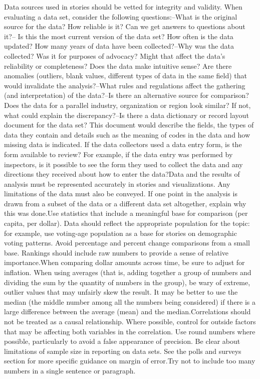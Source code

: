 \documentclass[]{book}
\begin{document}
Data sources used in stories should be vetted for integrity and validity. When evaluating a data set, consider the following questions:--What is the original source for the data? How reliable is it? Can we get answers to questions about it?-- Is this the most current version of the data set? How often is the data updated? How many years of data have been collected?--Why was the data collected? Was it for purposes of advocacy? Might that affect the data's reliability or completeness? Does the data make intuitive sense? Are there anomalies (outliers, blank values, different types of data in the same field) that would invalidate the analysis?--What rules and regulations affect the gathering (and interpretation) of the data?--Is there an alternative source for comparison? Does the data for a parallel industry, organization or region look similar? If not, what could explain the discrepancy?--Is there a data dictionary or record layout document for the data set? This document would describe the fields, the types of data they contain and details such as the meaning of codes in the data and how missing data is indicated. If the data collectors used a data entry form, is the form available to review? For example, if the data entry was performed by inspectors, is it possible to see the form they used to collect the data and any directions they received about how to enter the data?Data and the results of analysis must be represented accurately in stories and visualizations. Any limitations of the data must also be conveyed. If one point in the analysis is drawn from a subset of the data or a different data set altogether, explain why this was done.Use statistics that include a meaningful base for comparison (per capita, per dollar). Data should reflect the appropriate population for the topic: for example, use voting-age population as a base for stories on demographic voting patterns. Avoid percentage and percent change comparisons from a small base. Rankings should include raw numbers to provide a sense of relative importance.When comparing dollar amounts across time, be sure to adjust for inflation. When using averages (that is, adding together a group of numbers and dividing the sum by the quantity of numbers in the group), be wary of extreme, outlier values that may unfairly skew the result. It may be better to use the median (the middle number among all the numbers being considered) if there is a large difference between the average (mean) and the median.Correlations should not be treated as a causal relationship. Where possible, control for outside factors that may be affecting both variables in the correlation. Use round numbers where possible, particularly to avoid a false appearance of precision. Be clear about limitations of sample size in reporting on data sets. See the polls and surveys section for more specific guidance on margin of error.Try not to include too many numbers in a single sentence or paragraph.
\end{document}
